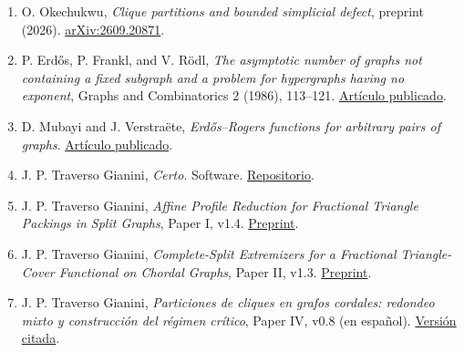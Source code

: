 \documentclass[spanish,11pt,a4paper]{article}
\begin{document}
\begin{enumerate}
\item
  O. Okechukwu, \emph{Clique partitions and bounded simplicial defect}, preprint (2026). \href{https://arxiv.org/abs/2609.20871}{arXiv:2609.20871}.
\item
  P. Erdős, P. Frankl, and V. Rödl, \emph{The asymptotic number of graphs not containing a fixed subgraph and a problem for hypergraphs having no exponent}, Graphs and Combinatorics 2 (1986), 113--121. \href{https://doi.org/10.1007/BF01788085}{Artículo publicado}.
\item
  D. Mubayi and J. Verstraëte, \emph{Erdős--Rogers functions for arbitrary pairs of graphs}. \href{https://doi.org/10.1002/rsa.70078}{Artículo publicado}.
\item
  J. P. Traverso Gianini, \emph{Certo}. Software. \href{https://github.com/jtraverso/certo-math}{Repositorio}.
\item
  J. P. Traverso Gianini, \emph{Affine Profile Reduction for Fractional Triangle Packings in Split Graphs}, Paper I, v1.4. \href{https://github.com/jtraverso/erdos-81-chordal-clique-partitions/blob/main/preprints/PAPER_I/README.md}{Preprint}.
\item
  J. P. Traverso Gianini, \emph{Complete-Split Extremizers for a Fractional Triangle-Cover Functional on Chordal Graphs}, Paper II, v1.3. \href{https://github.com/jtraverso/erdos-81-chordal-clique-partitions/blob/main/preprints/PAPER_II/README.md}{Preprint}.
\item
  J. P. Traverso Gianini, \emph{Particiones de cliques en grafos cordales: redondeo mixto y construcción del régimen crítico}, Paper IV, v0.8 (en español). \href{https://github.com/jtraverso/erdos-81-chordal-clique-partitions/blob/f783a792404a60983a7ef754d055fbe6c341188b/preprints/PAPER_IV/01_manuscript/PAPER_IV_preprint_v0.8_es.md}{Versión citada}.
\end{enumerate}
\end{document}
